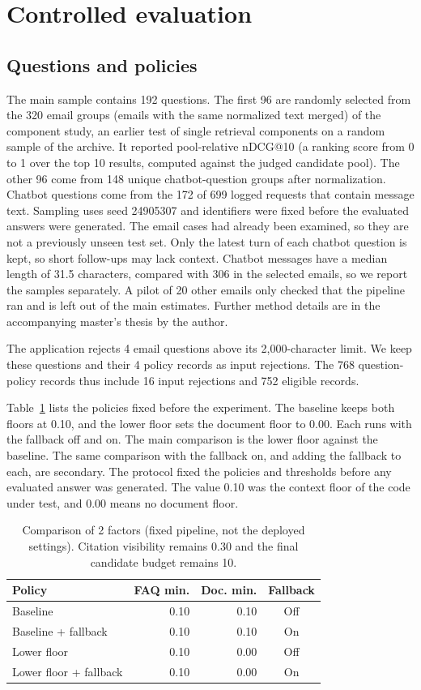 \documentclass[a4paper,10pt,twocolumn]{article}
\begin{document}
\section{Controlled evaluation}
\subsection{Questions and policies}
The main sample contains 192 questions. The first 96 are randomly selected from the 320 email groups (emails with the same normalized text merged) of the component study, an earlier test of single retrieval components on a random sample of the archive. It reported pool-relative nDCG@10 (a ranking score from 0 to 1 over the top 10 results, computed against the judged candidate pool). The other 96 come from 148 unique chatbot-question groups after normalization. Chatbot questions come from the 172 of 699 logged requests that contain message text. Sampling uses seed 24905307 and identifiers were fixed before the evaluated answers were generated. The email cases had already been examined, so they are not a previously unseen test set. Only the latest turn of each chatbot question is kept, so short follow-ups may lack context. Chatbot messages have a median length of 31.5 characters, compared with 306 in the selected emails, so we report the samples separately. A pilot of 20 other emails only checked that the pipeline ran and is left out of the main estimates. Further method details are in the accompanying master's thesis by the author.

The application rejects 4 email questions above its 2,000-character limit. We keep these questions and their 4 policy records as input rejections. The 768 question-policy records thus include 16 input rejections and 752 eligible records.

Table~\ref{tab:factorial} lists the policies fixed before the experiment. The baseline keeps both floors at 0.10, and the lower floor sets the document floor to 0.00. Each runs with the fallback off and on. The main comparison is the lower floor against the baseline. The same comparison with the fallback on, and adding the fallback to each, are secondary. The protocol fixed the policies and thresholds before any evaluated answer was generated. The value 0.10 was the context floor of the code under test, and 0.00 means no document floor.

\begin{table}[t]
\centering\small
\caption{Comparison of 2 factors (fixed pipeline, not the deployed settings). Citation visibility remains 0.30 and the final candidate budget remains 10.}\label{tab:factorial}
\begin{tabular}{lrrc}
\toprule
Policy & FAQ min. & Doc. min. & Fallback\\
\midrule
Baseline & 0.10 & 0.10 & Off\\
Baseline + fallback & 0.10 & 0.10 & On\\
Lower floor & 0.10 & 0.00 & Off\\
Lower floor + fallback & 0.10 & 0.00 & On\\
\bottomrule
\end{tabular}
\end{table}
\end{document}
